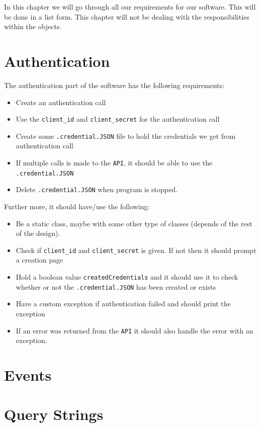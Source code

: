 \documentclass[10pt, a4paper]{memoir}
\numberwithin{equation}{section}
\theoremstyle{plain}
\theoremstyle{defp}
\theoremstyle{dotless}
\theoremstyle{definition}
\theoremstyle{dotless}
\theoremstyle{dotless}
\theoremstyle{defp}
\theoremstyle{defp}
\theoremstyle{be}          %
\theoremstyle{defp}
\newcommand\ttt[1]{\texttt{#1}}
\begin{document}
In this chapter we will go through all our requirements for our software. This will be done in a list form. This chapter will not be dealing with the responsibilities within the objects. 

\section{Authentication}

The authentication part of the software has the following requirements:

\begin{itemize}[noitemsep, topsep=1pt]
\item Create an authentication call
\item Use the \ttt{client\_id} and \ttt{client\_secret} for the authentication call
\item Create some \ttt{.credential.JSON} file to hold the credentials we get from authentication call
\item If multiple calls is made to the \ttt{API}, it should be able to use the \ttt{.credential.JSON}
\item Delete \ttt{.credential.JSON} when program is stopped.
\end{itemize}

Further more, it should have/use the following:

\begin{itemize}[noitemsep,topsep=1pt]
\item Be a static class, maybe with some other type of classes (depends of the rest of the design).
\item Check if \ttt{client\_id} and \ttt{client\_secret} is given. If not then it should prompt a creation page
\item Hold a boolean value \ttt{createdCredentials} and it should use it to check whether or not the \ttt{.credential.JSON} has been created or exists
\item Have a custom exception if authentication failed and should print the exception
\item If an error was returned from the \ttt{API} it should also handle the error with an exception. 
\end{itemize}

\section{Events}

\section{Query Strings }
\end{document}
